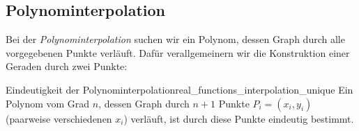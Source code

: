 \subsection{Polynominterpolation}
\label{subsec:real_functions_interpolation}
Bei der \emph{Polynominterpolation} 
suchen wir ein Polynom, dessen Graph durch alle vorgegebenen Punkte verläuft.
Dafür verallgemeinern wir die Konstruktion einer Geraden durch zwei Punkte:
\par\medskip
{\centering
  \par
  \nopagebreak\smallskip
  \par}
\medskip
\begin{TheoremBox}{Eindeutigkeit der Polynominterpolation}{real_functions_interpolation_unique}
  Ein Polynom vom Grad $n$, dessen Graph durch $n+1$ Punkte
  $P_i=(x_i,y_i)$ (paarweise verschiedenen $x_i$) verläuft, ist
  durch diese Punkte eindeutig bestimmt.
  \par\medskip
  {\centering
    \par}
\end{TheoremBox}
